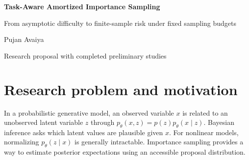 \documentclass[11pt,letterpaper]{article}
\begin{document}
\begin{center}
{\LARGE\bfseries\color{ink} Task-Aware Amortized Importance Sampling\par}
\vspace{5pt}
{\large From asymptotic difficulty to finite-sample risk under fixed sampling budgets\par}
\vspace{9pt}
{\normalsize Pujan Avaiya\par}
\vspace{3pt}
{\small Research proposal with completed preliminary studies\par}
\end{center}
\vspace{3pt}

\begin{abstract}
\noindent Importance sampling estimates posterior quantities when direct posterior sampling is difficult. In a batch of observations, uniform allocation and weight-based diagnostics do not explicitly minimize error for a specified posterior statistic. I study a learned allocation method based on the asymptotic variance of self-normalized importance sampling (SNIS), using an offline Monte Carlo teacher and a gradient-boosted regressor. On 25 independent test datasets per dimension, the original 4D and 8D Gaussian-mixture experiments gave 10.16\% and 8.92\% lower posterior-mean MSE than uniform allocation. A follow-up on 25 further datasets per dimension reproduced the gain (10.45\% and 8.88\%), but simple context-noise rules performed better (11.90\% and 10.25\%). Even the exact integer-constrained asymptotic oracle achieved only 6.50\% and 5.48\% measured reductions. Across 300 observations per dimension, at 48 draws the empirical risk was 57.7\% and 49.7\% of its asymptotic approximation. The variance nevertheless retained useful ranking information. Transfer to variational autoencoders (VAEs) was less convincing: independent Hamiltonian Monte Carlo (HMC) references gave an inconclusive 0.495\% reduction in 8D. These findings motivate a narrower question: can a learned finite-sample risk model improve over inexpensive allocation rules, and can calibration identify when the learned allocation should be shrunk toward a reliable baseline?
\end{abstract}
\section{Research problem and motivation}
In a probabilistic generative model, an observed variable $x$ is related to an unobserved latent variable $z$ through $p_\theta(x,z)=p(z)p_\theta(x\mid z)$. Bayesian inference asks which latent values are plausible given $x$. For nonlinear models, normalizing $p_\theta(z\mid x)$ is generally intractable. Importance sampling provides a way to estimate posterior expectations using an accessible proposal distribution.
\end{document}
